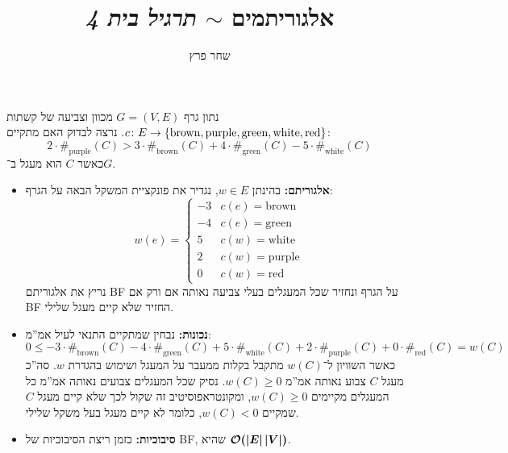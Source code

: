 \documentclass[]{../../../../tex/classes/homework}
\author{שחר פרץ}
\title{אלגוריתמים $\sim$ \textit{תרגיל בית 4}}
\begin{document}
	\maketitle
	\section{}
	נתון גרף $G = (V, E)$ מכוון וצביעה של קשתות $c \colon E \to \{\mathrm{brown}, \mathrm{purple}, \mathrm{green}, \mathrm{white}, \mathrm{red}\}$. נרצה לבדוק האם מתקיים:
	\[ 2 \cdot \#_{\mathrm{purple}}(C) > 3 \cdot \#_{\mathrm{brown}}(C) + 4  \cdot \#_{\mathrm{green}}(C) -5  \cdot \#_{\mathrm{white}}(C) \]
	כאשר $C$ הוא מעגל ב־$G$. 
	\begin{itemize}
		\item \textbf{אלגוריתם: }בהינתן $w \in E$, נגדיר את פונקציית המשקל הבאה על הגרף: 
		\[ w(e) = \begin{cases}
			-3 & c(e) = \mathrm{brown} \\
			-4 & c(e) = \mathrm{green} \\
			5 & c(w) = \mathrm{white} \\
			2 & c(w) = \mathrm{purple} \\
			0 & c(w) = \mathrm{red}
		\end{cases} \]
		נריץ את אלגוריתם BF על הגרף ונחזיר שכל המעגלים בעלי צביעה נאותה אם ורק אם BF החזיר שלא קיים מעגל שלילי. 
		\item \textbf{נכונות: }נבחין שמתקיים התנאי לעיל אמ''מ: 
		\[ 0 \le -3 \cdot \#_{\mathrm{brown}}(C) - 4  \cdot \#_{\mathrm{green}}(C) +5  \cdot \#_{\mathrm{white}}(C) + 2 \cdot \#_{\mathrm{purple}}(C) + 0 \cdot \#_{\mathrm{red}}(C) = w(C) \]
		כאשר השוויון ל־$w(C)$ מתקבל בקלות ממעבר על המעגל ושימוש בהגדרת $w$. סה''כ מעגל $C$ צבוע נאותה אמ''מ $w(C) \ge 0$. נסיק שכל המעגלים צבועים נאותה אמ''מ כל המעגלים מקיימים $w(C) \ge 0$, ומקונטראפוסיטיב זה שקול לכך שלא קיים מעגל $C$ שמקיים $w(C) < 0$, כלומר לא קיים מעגל בעל משקל שלילי. 
		\item \textbf{סיבוכיות: }כזמן ריצת הסיבוכיות של BF, שהיא $\bm{\mathcal{O}(\left \lvert E \right \rvert \left \lvert V \right \rvert)}$. 
	\end{itemize}

	 \npage	
\end{document}
